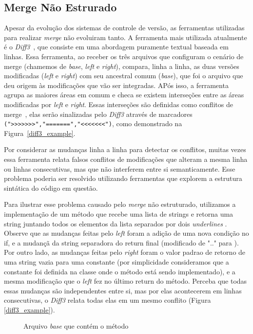 \subsection{Merge Não Estrurado}
Apesar da evolução dos sistemas de controle de versão, as ferramentas utilizadas para realizar
\emph{merge} não evoluiram tanto. A ferramenta mais utilizada atualmente é o \emph{Diff3}~\cite{mens02}, que consiste em uma
abordagem puramente textual baseada em linhas. Essa ferramenta, ao receber os três arquivos que configuram o cenário de merge
(chamemos de \emph{base}, \emph{left} e \emph{right}), compara, linha a linha, as duas versões modificadas
(\emph{left} e \emph{right}) com seu ancestral comum (\emph{base}), que foi o arquivo que deu origem às modificações
que vão ser integradas. APós isso, a ferramenta agrupa as maiores áreas em comum e checa se existem interseções entre as
áreas modificadas por \emph{left} e \emph{right}. Essas interseções são definidas como conflitos de merge~\cite{khan07},
elas serão sinalizadas pelo \emph{Diff3} através de marcadores \verb|(">>>>>>>","=======","<<<<<<<")|, como demonstrado na
Figura~\ref{diff3_example}.

Por considerar as mudanças linha a linha para detectar os conflitos, muitas vezes essa ferramenta relata falsos conflitos
de modificações que alteram a mesma linha ou linhas consecutivas, mas que não interferem entre si semanticamente.
Esse problema poderia ser resolvido utilizando ferramentas que explorem a estrutura sintática do código em questão.

Para ilustrar esse problema causado pelo \emph{merge} não estruturado, utilizamos a implementação de um método
 que
recebe uma lista de strings e retorna uma string juntando todos os elementos da lista separados por dois
\emph{underlines} . Observe que as mudanças feitas pelo \emph{left} foram a adição de uma nova
condição no if, e a mudançã da string separadora do return final (modificado de ".." para ). Por outro lado,
as mudanças feitas pelo \emph{right} foram o valor padrao de retorno de uma string vazia para uma constante (por simplicidade
consideramos que a constante foi definida na classe onde o método está sendo implementado), e a mesma
modificação que o \emph{left} fez no último return do método. Perceba que todas essas mudanças são independentes entre si,
mas por elas acontecerem em linhas consecutivas, o \emph{Diff3} relata todas elas em um mesmo conflito (Figura
\ref{diff3_example}).

\begin{figure}[ht]
	\begin{center}
		
		\caption{Arquivo \emph{base} que contém o método }\label{base_example}
	\end{center}
\end{figure}


